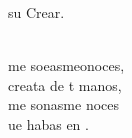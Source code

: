 \begin{cancion}
	 su Crear. \\\jump\\
	\begin{chorus}%
	 me soeasmeonoces, \\
	 creata de t manos, \\
	 me sonasme noces \\
	ue habas en . \\
	\end{chorus}%
	\jump\\
\end{cancion}%

